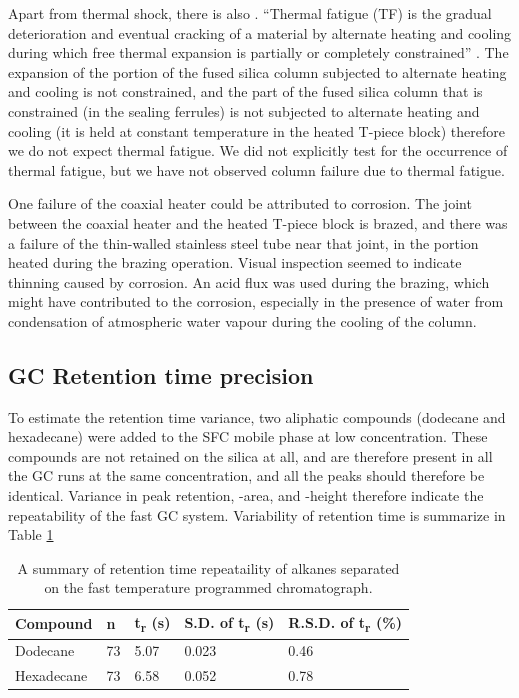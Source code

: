 Apart from thermal shock, there is also . ``Thermal
fatigue (TF) is the gradual deterioration and eventual cracking of a material by
alternate heating and cooling during which free thermal expansion is partially
or completely constrained'' \autocite{Rao2001}. The expansion of the portion of
the fused silica column subjected to alternate heating and cooling is not
constrained, and the part of the fused silica column that is constrained (in the
sealing ferrules) is not subjected to alternate heating and cooling (it is held
at constant temperature in the heated T-piece block) therefore we do not expect
thermal fatigue. We did not explicitly test for the occurrence of thermal
fatigue, but we have not observed column failure due to thermal fatigue.

One failure of the coaxial heater could be attributed to corrosion. The joint
between the coaxial heater and the heated T-piece block is brazed, and there was
a failure of the thin-walled stainless steel tube near that joint, in the
portion heated during the brazing operation. Visual inspection seemed to
indicate thinning caused by corrosion. An acid flux was used during the brazing,
which might have contributed to the corrosion, especially in the presence of
water from condensation of atmospheric water vapour during the cooling of the
column.

\subsection{GC Retention time precision}

To estimate the retention time variance, two aliphatic compounds (dodecane and
hexadecane) were added to the SFC mobile phase at low concentration. These
compounds are not retained on the silica at all, and are therefore present in
all the GC runs at the same concentration, and all the peaks should therefore be
identical. Variance in peak retention, -area, and -height therefore indicate the
repeatability of the fast GC system. Variability of retention time is summarize
in Table \ref{tab:RetentionTimeVariance}

\begin{table}

\caption{\label{tab:RetentionTimeVariance}A summary of retention time repeataility of alkanes
separated on the fast temperature programmed chromatograph.}

\begin{tabular}{lllll}
Compound & n & t\textsubscript{r} (s) & S.D. of t\textsubscript{r} (s)& R.S.D. of t\textsubscript{r} (\%)\\
\hline
Dodecane & 73 & 5.07 & 0.023 & 0.46\\
Hexadecane & 73 & 6.58 & 0.052 & 0.78\\
\end{tabular}

\end{table}

